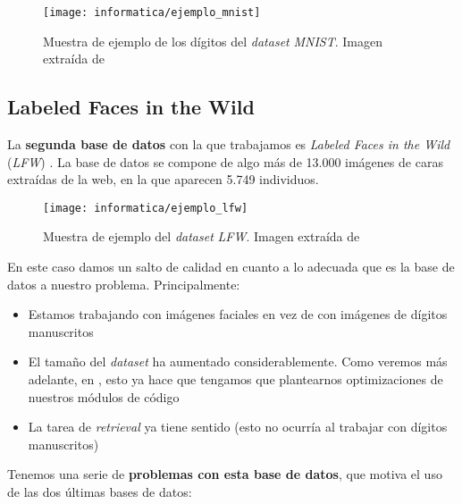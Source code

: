 \begin{figure}[H]
    \centering
    \texttt{[image: informatica/ejemplo\_mnist]}
    \caption{Muestra de ejemplo de los dígitos del \textit{dataset} \textit{MNIST}. Imagen extraída de \cite{informatica:mnist_papers_with_code}}
\end{figure}


\subsection{Labeled Faces in the Wild}

La \textbf{segunda base de datos} con la que trabajamos es \textit{Labeled Faces in the Wild} (\textit{LFW}) \cite{informatica:lfw_dataset}. La base de datos se compone de algo más de 13.000 imágenes de caras extraídas de la web, en la que aparecen 5.749 individuos.

\begin{figure}[H]
    \centering
    \texttt{[image: informatica/ejemplo\_lfw]}
    \caption{Muestra de ejemplo del \textit{dataset} \textit{LFW}. Imagen extraída de \cite{informatica:papers_with_code_lfw}}
\end{figure}

En este caso damos un salto de calidad en cuanto a lo adecuada que es la base de datos a nuestro problema. Principalmente:

\begin{itemize}
    \item Estamos trabajando con imágenes faciales en vez de con imágenes de dígitos manuscritos
    \item El tamaño del \textit{dataset} ha aumentado considerablemente. Como veremos más adelante, en , esto ya hace que tengamos que plantearnos optimizaciones de nuestros módulos de código
    \item La tarea de \textit{retrieval} ya tiene sentido (esto no ocurría al trabajar con dígitos manuscritos)
\end{itemize}

Tenemos una serie de \textbf{problemas con esta base de datos}, que motiva el uso de las dos últimas bases de datos:

